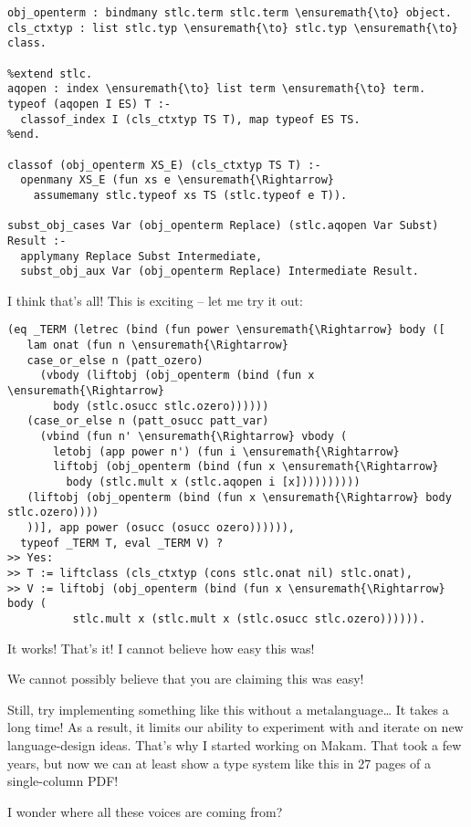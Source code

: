 \begin{verbatim}
obj_openterm : bindmany stlc.term stlc.term \ensuremath{\to} object.
cls_ctxtyp : list stlc.typ \ensuremath{\to} stlc.typ \ensuremath{\to} class.

%extend stlc.
aqopen : index \ensuremath{\to} list term \ensuremath{\to} term.
typeof (aqopen I ES) T :-
  classof_index I (cls_ctxtyp TS T), map typeof ES TS.
%end.

classof (obj_openterm XS_E) (cls_ctxtyp TS T) :-
  openmany XS_E (fun xs e \ensuremath{\Rightarrow}
    assumemany stlc.typeof xs TS (stlc.typeof e T)).

subst_obj_cases Var (obj_openterm Replace) (stlc.aqopen Var Subst) Result :-
  applymany Replace Subst Intermediate,
  subst_obj_aux Var (obj_openterm Replace) Intermediate Result.
\end{verbatim}

\heroSTUDENT{} I think that's all! This is exciting -- let me try it out:

\begin{verbatim}
(eq _TERM (letrec (bind (fun power \ensuremath{\Rightarrow} body ([
   lam onat (fun n \ensuremath{\Rightarrow}
   case_or_else n (patt_ozero)
     (vbody (liftobj (obj_openterm (bind (fun x \ensuremath{\Rightarrow}
       body (stlc.osucc stlc.ozero))))))
   (case_or_else n (patt_osucc patt_var)
     (vbind (fun n' \ensuremath{\Rightarrow} vbody (
       letobj (app power n') (fun i \ensuremath{\Rightarrow}
       liftobj (obj_openterm (bind (fun x \ensuremath{\Rightarrow}
         body (stlc.mult x (stlc.aqopen i [x])))))))))
   (liftobj (obj_openterm (bind (fun x \ensuremath{\Rightarrow} body stlc.ozero))))
   ))], app power (osucc (osucc ozero)))))),
  typeof _TERM T, eval _TERM V) ?
>> Yes:
>> T := liftclass (cls_ctxtyp (cons stlc.onat nil) stlc.onat),
>> V := liftobj (obj_openterm (bind (fun x \ensuremath{\Rightarrow} body (
          stlc.mult x (stlc.mult x (stlc.osucc stlc.ozero)))))).
\end{verbatim}

\noindent
It works! That's it! I cannot believe how easy this was!

\heroAUDIENCE{} We cannot possibly believe that you are claiming this was
easy!

\heroAUTHOR{} Still, try implementing something like this without a
metalanguage\ldots{} It takes a long time! As a result, it limits our
ability to experiment with and iterate on new language-design ideas.
That's why I started working on Makam. That took a few years, but now we
can at least show a type system like this in 27 pages of a single-column
PDF!

\heroADVISOR{} I wonder where all these voices are coming from?
